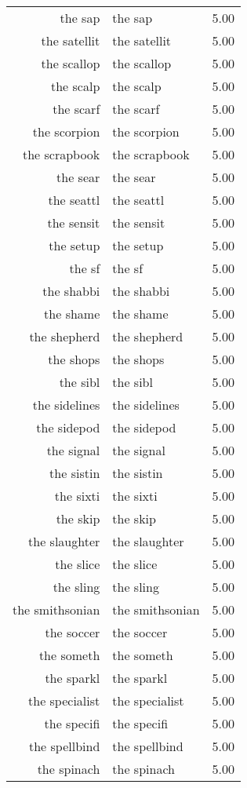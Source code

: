 \begin{table}[ht]
\begin{tabular}{rlr}
  the sap & the sap & 5.00 \\ 
  the satellit & the satellit & 5.00 \\ 
  the scallop & the scallop & 5.00 \\ 
  the scalp & the scalp & 5.00 \\ 
  the scarf & the scarf & 5.00 \\ 
  the scorpion & the scorpion & 5.00 \\ 
  the scrapbook & the scrapbook & 5.00 \\ 
  the sear & the sear & 5.00 \\ 
  the seattl & the seattl & 5.00 \\ 
  the sensit & the sensit & 5.00 \\ 
  the setup & the setup & 5.00 \\ 
  the sf & the sf & 5.00 \\ 
  the shabbi & the shabbi & 5.00 \\ 
  the shame & the shame & 5.00 \\ 
  the shepherd & the shepherd & 5.00 \\ 
  the shops & the shops & 5.00 \\ 
  the sibl & the sibl & 5.00 \\ 
  the sidelines & the sidelines & 5.00 \\ 
  the sidepod & the sidepod & 5.00 \\ 
  the signal & the signal & 5.00 \\ 
  the sistin & the sistin & 5.00 \\ 
  the sixti & the sixti & 5.00 \\ 
  the skip & the skip & 5.00 \\ 
  the slaughter & the slaughter & 5.00 \\ 
  the slice & the slice & 5.00 \\ 
  the sling & the sling & 5.00 \\ 
  the smithsonian & the smithsonian & 5.00 \\ 
  the soccer & the soccer & 5.00 \\ 
  the someth & the someth & 5.00 \\ 
  the sparkl & the sparkl & 5.00 \\ 
  the specialist & the specialist & 5.00 \\ 
  the specifi & the specifi & 5.00 \\ 
  the spellbind & the spellbind & 5.00 \\ 
  the spinach & the spinach & 5.00 \\ 

\end{tabular}
\end{table}
